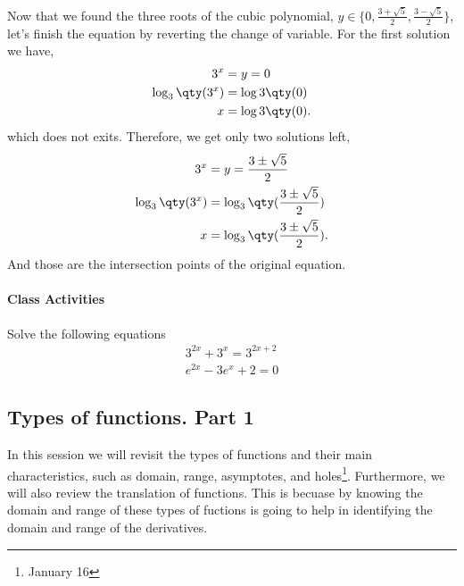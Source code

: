 \documentclass[../main-notes.tex]{subfile}
\begin{document}
Now that we found the three roots of the cubic polynomial, $y\in\{0,\frac{3+\sqrt{5}}{2},\frac{3-\sqrt{5}}{2}\}$, let's finish the equation by reverting the change of variable.
For the first solution we have,
\begin{align*}
    3^{x} &= y = 0 \\
    \log_{3}\qty(3^x) &= \log{3}\qty(0) \\
    x &= \log{3}\qty(0).
\end{align*}
which does not exits.
Therefore, we get only two solutions left,
\begin{align*}
    3^x &=y = \frac{3\pm\sqrt{5}}{2} \\
    \log_{3}\qty(3^x) &= \log_{3}\qty(\frac{3\pm\sqrt{5}}{2}) \\
    x &= \log_{3}\qty(\frac{3\pm\sqrt{5}}{2}).
\end{align*}
And those are the intersection points of the original equation.

\paragraph{Class Activities}

Solve the following equations 
\begin{gather*}
    3^{2x} + 3^{x} = 3^{2x+2} \\
    e^{2x} -3e^{x} +2 = 0 
\end{gather*}


\newpage 

\subsection{Types of functions. Part 1}

In this session we will revisit the types of functions and their main characteristics, such as domain, range, asymptotes, and holes\footnote{January 16}.
Furthermore, we will also review the translation of functions.
This is becuase by knowing the domain and range of these types of fuctions is going to help in identifying the domain and range of the derivatives.
\end{document}
